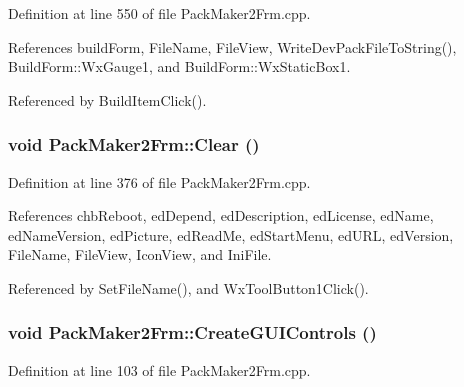 Definition at line 550 of file Pack\-Maker2Frm.cpp.

References build\-Form, File\-Name, File\-View, Write\-Dev\-Pack\-File\-To\-String(), Build\-Form::Wx\-Gauge1, and Build\-Form::Wx\-Static\-Box1.

Referenced by Build\-Item\-Click().
\subsubsection{\setlength{\rightskip}{0pt plus 5cm}void Pack\-Maker2Frm::Clear ()}\label{class_pack_maker2_frm_958569136933ac2390bb13816fa308a9}




Definition at line 376 of file Pack\-Maker2Frm.cpp.

References chb\-Reboot, ed\-Depend, ed\-Description, ed\-License, ed\-Name, ed\-Name\-Version, ed\-Picture, ed\-Read\-Me, ed\-Start\-Menu, ed\-URL, ed\-Version, File\-Name, File\-View, Icon\-View, and Ini\-File.

Referenced by Set\-File\-Name(), and Wx\-Tool\-Button1Click().
\subsubsection{\setlength{\rightskip}{0pt plus 5cm}void Pack\-Maker2Frm::Create\-GUIControls ()\hspace{0.3cm}{\tt  [private]}}\label{class_pack_maker2_frm_4151afa409623c09e51e061b2d3ed0d8}




Definition at line 103 of file Pack\-Maker2Frm.cpp.

